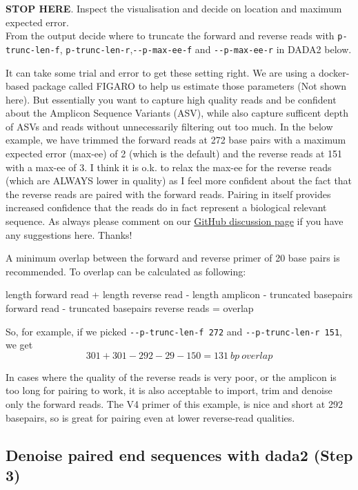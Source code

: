 \documentclass[
]{book}
\begin{document}
\textbf{STOP HERE}. Inspect the visualisation and decide on location and maximum expected error.\\
From the output decide where to truncate the forward and reverse reads with \texttt{p-trunc-len-f}, \texttt{p-trunc-len-r},\texttt{-\/-p-max-ee-f} and \texttt{-\/-p-max-ee-r} in DADA2 below.

It can take some trial and error to get these setting right. We are using a docker-based package called FIGARO to help us estimate those parameters (Not shown here). But essentially you want to capture high quality reads and be confident about the Amplicon Sequence Variants (ASV), while also capture sufficent depth of ASVs and reads without unnecessarily filtering out too much. In the below example, we have trimmed the forward reads at 272 base pairs with a maximum expected error (max-ee) of 2 (which is the default) and the reverse reads at 151 with a max-ee of 3. I think it is o.k. to relax the max-ee for the reverse reads (which are ALWAYS lower in quality) as I feel more confident about the fact that the reverse reads are paired with the forward reads. Pairing in itself provides increased confidence that the reads do in fact represent a biological relevant sequence. As always please comment on our \href{https://github.com/chrismitbiz/ABlab-workflows/discussions/}{GitHub discussion page} if you have any suggestions here. Thanks!

A minimum overlap between the forward and reverse primer of 20 base pairs is recommended. To overlap can be calculated as following:

length forward read + length reverse read - length amplicon - truncated basepairs forward read - truncated basepairs reverse reads = overlap

So, for example, if we picked \texttt{-\/-p-trunc-len-f\ 272} and \texttt{-\/-p-trunc-len-r\ 151}, we get
\[301 + 301 - 292 - 29  - 150 = 131~bp~overlap\]

In cases where the quality of the reverse reads is very poor, or the amplicon is too long for pairing to work, it is also acceptable to import, trim and denoise only the forward reads. The V4 primer of this example, is nice and short at 292 basepairs, so is great for pairing even at lower reverse-read qualities.

\hypertarget{denoise-paired-end-sequences-with-dada2-step-3}{%
\subsection{Denoise paired end sequences with dada2 (Step 3)}\label{denoise-paired-end-sequences-with-dada2-step-3}}
\end{document}
